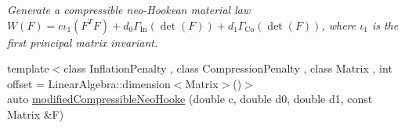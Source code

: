 \begin{DoxyCompactItemize}
\begin{DoxyCompactList}\small\item\em Generate a compressible neo-\/\-Hookean material law $ W(F)=c\iota_1(F^T F)+d_0\Gamma_\mathrm{In}(\det(F))+d_1\Gamma_\mathrm{Co}(\det(F)) $, where $\iota_1$ is the first principal matrix invariant. \end{DoxyCompactList}\item 
\hypertarget{group__Rubber_gad4985bcfe7726155b3b53f94094ebb3e}{{\footnotesize template$<$class Inflation\-Penalty , class Compression\-Penalty , class Matrix , int offset = Linear\-Algebra\-::dimension$<$\-Matrix$>$()$>$ }\\auto \hyperlink{group__Rubber_gad4985bcfe7726155b3b53f94094ebb3e}{modified\-Compressible\-Neo\-Hooke} (double c, double d0, double d1, const Matrix \&F)}\label{group__Rubber_gad4985bcfe7726155b3b53f94094ebb3e}


\end{DoxyCompactItemize}
